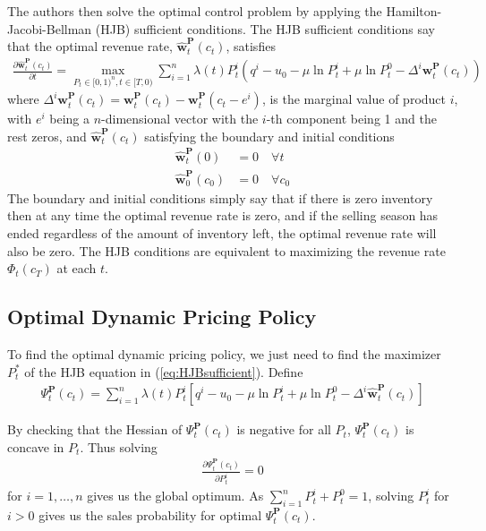 The authors then solve the optimal control problem by applying the Hamilton-Jacobi-Bellman (HJB) sufficient conditions. The HJB sufficient conditions say that the optimal revenue rate, $\hat{\mathbf{w}}_t^{\mathbf{P}}(c_t)$, satisfies
\begin{align}
\frac{\partial \hat{\mathbf{w}}_t^{\mathbf{P}}(c_t)}{\partial t} = \max_{P_t \in [0,1)^n, t \in [T,0)}\sum_{i=1}^{n} \lambda(t)P_t^i \left(q^i-u_0-\mu \ln P_t^i + \mu \ln P_t^0- \Delta^i \mathbf{w}_t^{\mathbf{P}}(c_t)\right) \label{eq:HJBsufficient}
\end{align}
where $\Delta^i \mathbf{w}_t^{\mathbf{P}}(c_t) = \mathbf{w}_t^{\mathbf{P}}(c_t) - \mathbf{w}_t^{\mathbf{P}}(c_t-e^i)$, is the marginal value of product $i$, with $e^i$ being a $n$-dimensional vector with the $i$-th component being 1 and the rest zeros, and $\hat{\mathbf{w}}_t^{\mathbf{P}}(c_t)$ satisfying the boundary and initial conditions
\begin{align}
\hat{\mathbf{w}}_t^{\mathbf{P}}(0) &= 0 \quad \forall t\\
\hat{\mathbf{w}}_0^{\mathbf{P}}(c_0) &= 0 \quad \forall c_0
\end{align}
The boundary and initial conditions simply say that if there is zero inventory then at any time the optimal revenue rate is zero, and if the selling season has ended regardless of the amount of inventory left, the optimal revenue rate will also be zero. The HJB conditions are equivalent to maximizing the revenue rate $\Phi_t(c_T)$  at each $t$.


\subsection{Optimal Dynamic Pricing Policy}

To find the optimal dynamic pricing policy, we just need to find the maximizer $P_t^\ast$ of the HJB equation in (\ref{eq:HJBsufficient}). Define
\begin{align}
\Psi_t^{\mathbf{P}}(c_t) = \sum_{i=1}^{n}\lambda(t)P_t^i\left[q^i-u_0-\mu \ln P_t^i + \mu \ln P_t^0- \Delta^i \hat{\mathbf{w}}_t^{\mathbf{P}}(c_t)\right]
\end{align}

By checking that the Hessian of $\Psi_t^{\mathbf{P}}(c_t)$ is negative for all $P_t$, $\Psi_t^{\mathbf{P}}(c_t)$ is concave in $P_t$. Thus solving
\begin{align*}
\frac{\partial \Psi_t^{\mathbf{P}}(c_t)}{\partial P_t^i} = 0 
\end{align*}
for $i=1,\ldots, n$ gives us the global optimum. As $\sum_{i=1}^{n}P_t^i+P_t^0=1$, solving $P_t^i$ for $i>0$ gives us the sales probability for optimal $\Psi_t^{\mathbf{P}}(c_t)$.

